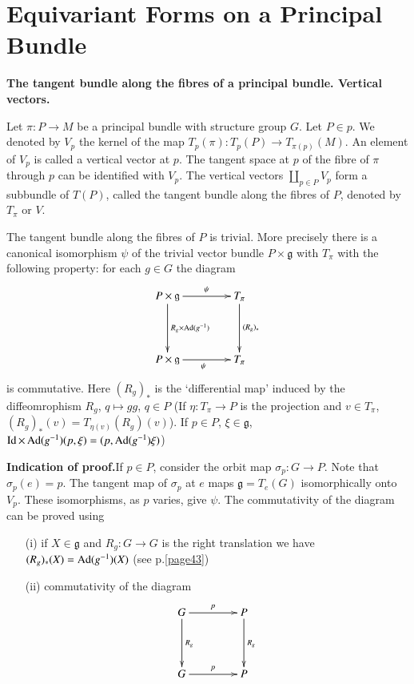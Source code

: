 \chapter{Equivariant Forms on a Principal Bundle}\label{chap11}

{\bf The tangent bundle along the fibres of a principal bundle. Vertical vectors.}

Let $\pi:P\to M$ be a principal bundle with structure group $G$. Let $P\in p$. We denoted by $V_{p}$ the kernel of the map $T_{p}(\pi):T_{p}(P)\to T_{\pi(p)}(M)$. An element of $V_{p}$ is called a vertical vector at $p$. The tangent space at $p$ of the fibre of $\pi$ through $p$ can be identified with $V_{p}$. The vertical vectors $\coprod\limits_{p\in P}V_{p}$ form a subbundle of $T(P)$, called the tangent bundle along the fibres of $P$, denoted by $T_{\pi}$ or $V$.

\begin{proposition}\label{chap11-prop11.1}
The tangent bundle along the fibres of $P$ is trivial. More precisely there is a canonical isomorphism $\psi$ of the trivial vector bundle $P\times \mathfrak{g}$ with $T_{\pi}$ with the following property: for each $g\in G$ the diagram
\[
\xymatrix@=1.5cm{
P\times \mathfrak{g}\ar[d]^{R_{g}\times \Ad (g^{-1})}\ar[r]^-{\psi} & T_{\pi}\ar[d]^{(R_{g})_{*}}\\
P\times \mathfrak{g}\ar[r]_{\psi} & T_{\pi}
}
\]
is commutative. Here $(R_{g})_{*}$ is the `differential map' induced by the diffeomrophism $R_{g}$, $q\mapsto gg$, $q\in P$ (If $\eta:T_{\pi}\to P$ is the projection and $v\in T_{\pi}$, $(R_{g})_{*}(v)=T_{\eta(v)}(R_{g})(v)$). If $p\in P$, $\xi\in \mathfrak{g}$, $\operatorname{Id}\times \operatorname{Ad} (g^{-1})(p,\xi)=(p,\operatorname{Ad}(g^{-1})\xi)$)
\end{proposition}

\noindent
{\bf Indication of proof.}\pageoriginale If $p\in P$, consider the orbit map $\sigma_{p}:G\to P$. Note that $\sigma_{p}(e)=p$. The tangent map of $\sigma_{p}$ at $e$ maps $\mathfrak{g}=T_{e}(G)$ isomorphically onto $V_{p}$. These isomorphisms, as $p$ varies, give $\psi$. The commutativity of the diagram can be proved using
\begin{itemize}
\item[(i)] if $X\in \mathfrak{g}$ and $R_{g}:G\to G$ is the right translation we have $(R_{g})_{*}(X)=\operatorname{Ad}(g^{-1})(X)$ (see p.\ref{page43})

\item[(ii)] commutativity of the diagram
\[
\xymatrix@=1.5cm{
G\ar[d]^{R_{g}} \ar[r]^{p} & P\ar[d]^{R_{g}}\\
G\ar[r]^{p} & P
}
\]

\end{itemize}

